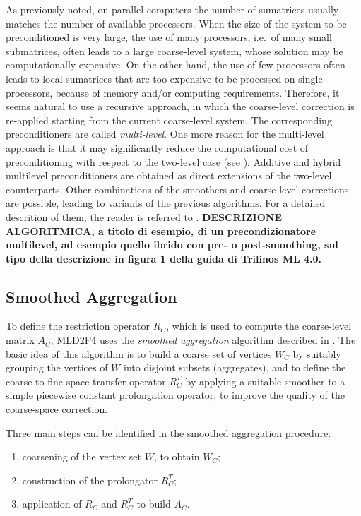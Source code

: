 As previously noted, on parallel computers the number of sumatrices usually matches
the number of available processors. When the size of the system to be preconditioned
is very large, the use of many processors, i.e.\ of many small submatrices, often
leads to a large coarse-level system, whose solution may be computationally expensive.
On the other hand, the use of few processors often leads to local sumatrices that
are too expensive to be processed on single processors, because of memory and/or
computing requirements. Therefore, it seems natural to use a recursive approach,
in which the coarse-level correction is re-applied starting from the current
coarse-level system. The corresponding preconditioners are called \emph{multi-level}.
One more reason for the multi-level approach is that it may significantly
reduce the computational cost of preconditioning with respect to the two-level case
(see \cite[Chapter 3]{dd2_96}). Additive and hybrid multilevel preconditioners
are obtained as direct extensions of the two-level counterparts. Other combinations
of the smoothers and coarse-level corrections are possible, leading to variants
of the previous algorithms. For a detailed descrition of them, the reader is
referred to \cite[Chapter 3]{dd2_96}.
\textbf{DESCRIZIONE ALGORITMICA, a titolo di esempio,
di un precondizionatore multilevel, ad esempio quello ibrido con pre- o post-smoothing,
sul tipo della descrizione in figura 1 della guida di Trilinos ML 4.0.}


\subsection{Smoothed Aggregation\label{sec:aggregation}}

To define the restriction operator $R_C$, which is used to compute
the coarse-level matrix $A_C$, MLD2P4 uses the \emph{smoothed aggregation}
algorithm described in \cite{Brezina_Vanek_,Vanek_Mandel_Brezina_}.
The basic idea of this algorithm is to build a coarse set of vertices
$W_C$ by suitably grouping the vertices of $W$ into disjoint subsets
(aggregates), and to define the coarse-to-fine space transfer operator $R_C^T$ by
applying a suitable smoother to a simple piecewise constant
prolongation operator, to improve the quality of the coarse-space correction.

Three main steps can be identified in the smoothed aggregation procedure:
\begin{enumerate}
	\item coarsening of the vertex set $W$, to obtain $W_C$;
	\item construction of the prolongator $R_C^T$;
	\item application of $R_C$ and $R_C^T$ to build $A_C$.
\end{enumerate}
 
